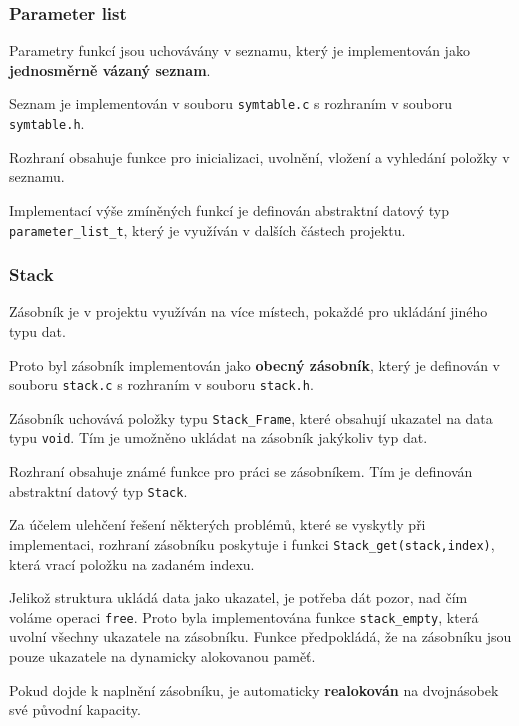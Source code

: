 \documentclass[a4paper, 11pt]{article}
\begin{document}
	\subsubsection{Parameter list}
	Parametry funkcí jsou uchovávány v seznamu, který je implementován jako \textbf{jednosměrně vázaný seznam}.
	\par\noindent Seznam je implementován v souboru \texttt{symtable.c} s rozhraním v souboru \texttt{symtable.h}.
	\par\noindent Rozhraní obsahuje funkce pro inicializaci, uvolnění, vložení a vyhledání položky v seznamu.
	\par\noindent Implementací výše zmíněných funkcí je definován abstraktní datový typ \texttt{parameter\_list\_t}, který je vy\-užíván v dalších částech projektu.


	\subsubsection{Stack}
	Zásobník je v projektu využíván na více místech, pokaždé pro ukládání jiného typu dat.
	\par\noindent Proto byl zásobník implementován jako \textbf{obecný zásobník}, který je definován v souboru \texttt{stack.c} s rozhraním v souboru \texttt{stack.h}.
	\par\noindent Zásobník uchovává položky typu \texttt{Stack\_Frame}, které obsahují ukazatel na data typu \texttt{void}. Tím je umožněno ukládat na zásobník jakýkoliv typ dat.
	\par\noindent Rozhraní obsahuje známé funkce pro práci se zásobníkem. Tím je definován abstraktní datový typ \texttt{Stack}.
	\par\noindent Za účelem ulehčení řešení některých problémů, které se vyskytly při implementaci, rozhraní zásobníku poskytuje i funkci \texttt{Stack\_get(stack,index)}, která vrací položku na zadaném indexu.
	\par\noindent Jelikož struktura ukládá data jako ukazatel, je potřeba dát pozor, nad čím voláme operaci \texttt{free}. Proto byla implementována funkce \texttt{stack\_empty}, která uvolní všechny ukazatele na zásobníku. Funkce předpokládá, že na zásobníku jsou pouze ukazatele na dynamicky alokovanou paměť.
	\par\noindent Pokud dojde k naplnění zásobníku, je automaticky \textbf{realokován} na dvojnásobek své původní kapacity.
\end{document}
